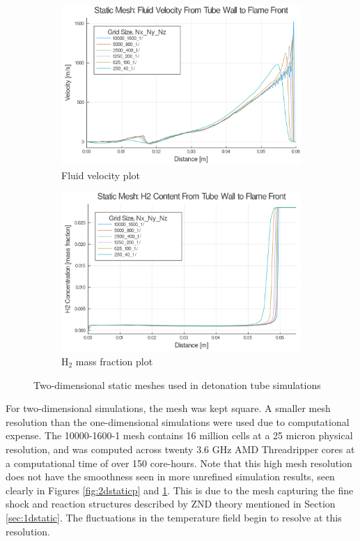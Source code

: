 \begin{figure} \ContinuedFloat
    
    \begin{subfigure}[]{0.95\textwidth}
        \centering
        \includegraphics[width=\textwidth]{./figs/staticfigs/u.png}
        \caption{Fluid velocity plot}
        \label{fig:2dstaticu}
    \end{subfigure}

    \begin{subfigure}[]{0.95\textwidth}
        \centering
        \includegraphics[width=\textwidth]{./figs/staticfigs/y.png}
        \caption{H\(_2\) mass fraction plot}
    \end{subfigure}

    \caption{Two-dimensional static meshes used in detonation tube simulations}
    \label{fig:2dstatic}
\end{figure}%
For two-dimensional simulations, the mesh was kept square. A smaller mesh resolution than the one-dimensional simulations were used due to computational expense. The 10000-1600-1 mesh contains 16 million cells at a 25 micron physical resolution, and was computed across twenty 3.6 GHz AMD Threadripper cores at a computational time of over 150 core-hours. Note that this high mesh resolution does not have the smoothness seen in more unrefined simulation results, seen clearly in Figures \ref{fig:2dstaticp} and \ref{fig:2dstaticu}. This is due to the mesh capturing the fine shock and reaction structures described by ZND theory mentioned in Section \ref{sec:1dstatic}. The fluctuations in the temperature field begin to resolve at this resolution. 

